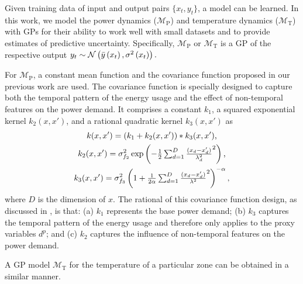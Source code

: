 Given training data of input and output pairs $\{x_{t}, y_{t}\}$, a model can be learned.
%
In this work, we model the power dynamics ($\mathcal{M}_{\mathrm{P}}$) and temperature dynamics ($\mathcal{M}_{\mathrm{T}}$) with GPs for their ability to work well with small datasets and to provide estimates of predictive uncertainty.
Specifically, $\mathcal{M}_{\mathrm{P}}$ or $\mathcal{M}_{\mathrm{T}}$ is a GP of the respective output
\begin{math}
  y_{t} \sim \operatorname*{\mathcal{N}}\left(\bar{y}\left(x_{t}\right), \sigma^{2}\left(x_{t}\right)\right) \text.
\end{math}

For $\mathcal{M}_{\mathrm{P}}$, a constant mean function and the covariance function proposed in our previous work \cite{nghiemetal16gp} are used.
The covariance function is specially designed to capture both the temporal pattern of the energy usage and the effect of non-temporal features on the power demand.
It comprises a constant \(k_{1}\), a squared exponential kernel \(k_2(x,x')\), and a rational quadratic kernel \(k_{3}(x,x')\) as
%
\begin{gather}
  k(x,x') = \left(k_1 + k_2(x,x')\right)*k_3(x,x')\text,\nonumber\\
  k_2(x,x') = \sigma_{f_2}^2 \exp \left( -\textstyle\frac{1}{2} \textstyle\sum_{d=1}^D \frac{(x_d-x_d')}{{\lambda_d^2}}^2 \right)\text,
 \nonumber\\
 k_3(x,x') = \sigma_{f_3}^2  \left( 1+ \textstyle\frac{1}{2\alpha} \textstyle\sum_{d=1}^D \frac{(x_d-x_d')}{{\lambda^2}}^2 \right)^{-\alpha}\text,
\end{gather}
%
where \(D\) is the dimension of \(x\).
The rational of this covariance function design, as discussed in \cite{nghiemetal16gp}, is that:
(a) $k_{1}$ represents the base power demand;
(b) $k_{3}$ captures the temporal pattern of the energy usage and therefore only applies to the proxy variables $d^{p}$; and
(c) $k_{2}$ captures the influence of non-temporal features on the power demand.

A GP model $\mathcal{M}_{\mathrm{T}}$ for the temperature of a particular zone can be obtained in a similar manner.


% 	

